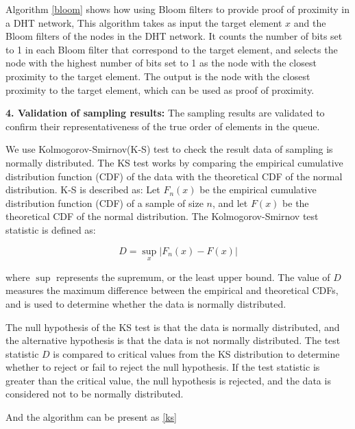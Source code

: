 \documentclass[twocolumn]{article}
\begin{document}
Algorithm \ref{bloom} shows how using Bloom filters to provide proof of proximity in a DHT network, This algorithm takes as input the target element $x$ and the Bloom filters of the nodes in the DHT network. It counts the number of bits set to 1 in each Bloom filter that correspond to the target element, and selects the node with the highest number of bits set to 1 as the node with the closest proximity to the target element. The output is the node with the closest proximity to the target element, which can be used as proof of proximity.

\textbf{4. Validation of sampling results:} The sampling results are validated to confirm their representativeness of the true order of elements in the queue.

We use Kolmogorov-Smirnov(K-S) test to check the result data of sampling is normally distributed. The KS test works by comparing the empirical cumulative distribution function (CDF) of the data with the theoretical CDF of the normal distribution. K-S is described as:
Let $F_{n}(x)$ be the empirical cumulative distribution function (CDF) of a sample of size $n$, and let $F(x)$ be the theoretical CDF of the normal distribution. The Kolmogorov-Smirnov test statistic is defined as:

\begin{equation}
D = \sup_{x} \left| F_{n}(x) - F(x) \right|
\end{equation}

where $\sup$ represents the supremum, or the least upper bound. The value of $D$ measures the maximum difference between the empirical and theoretical CDFs, and is used to determine whether the data is normally distributed.

The null hypothesis of the KS test is that the data is normally distributed, and the alternative hypothesis is that the data is not normally distributed. The test statistic $D$ is compared to critical values from the KS distribution to determine whether to reject or fail to reject the null hypothesis. If the test statistic is greater than the critical value, the null hypothesis is rejected, and the data is considered not to be normally distributed.

And the algorithm can be present as \ref{ks}
\end{document}
